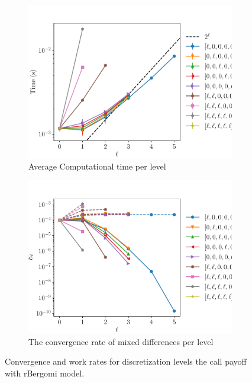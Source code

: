 \documentclass[11pt]{article}
\begin{document}
\begin{figure}[!h]
	\centering
	\begin{subfigure}{.5\textwidth}
		\centering
		\includegraphics[width=0.95\linewidth]{./figures/rbergomi_16_steps_K_1_2/level_work.pdf}
		\caption{Average Computational time per level}
		\label{fig:misc_rbergomi_16_steps_K_1_2_sub3}
	\end{subfigure}%
	\begin{subfigure}{.5\textwidth}
		\centering
		\includegraphics[width=0.95\linewidth]{./figures/rbergomi_16_steps_K_1_2/levels_error_rate.pdf}
		\caption{  The convergence rate of mixed differences per level}
		\label{fig:misc_rbergomi_16_steps_K_1_2_sub4}
	\end{subfigure}%
	\caption{Convergence and work rates for discretization levels  the call payoff with rBergomi model.}
	\label{fig:misc_rbergomi_16_steps_K_1_2_2}
\end{figure}

\newpage

 
\end{document}
